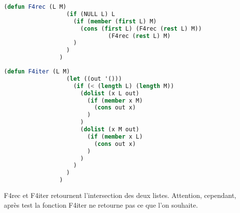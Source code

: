 \documentclass[a4paper, 12pt, leqno]{report}
\theoremstyle{plain}
\begin{document}
            
            \begin{lstlisting}[label=some-code,caption=F4 (L M) version recursive,language=lisp]
                (defun F4rec (L M)
	              (if (NULL L) L
		            (if (member (first L) M) 
		              (cons (first L) (F4rec (rest L) M)) 
                              (F4rec (rest L) M)
		            )	
	              )
                ) 
            \end{lstlisting}
          
            \begin{lstlisting}[label=some-code,caption=F4 (L M) version itérative,language=lisp]
                (defun F4iter (L M)
	              (let ((out '()))
		            (if (< (length L) (length M))
			          (dolist (x L out) 
				        (if (member x M)
					      (cons out x)
				        ) 
			          )
			          (dolist (x M out)
				        (if (member x L)
					      (cons out x)
				        )
			          )
		            )
	              )
                )
            \end{lstlisting}       
F4rec et F4iter retournent l'intersection des deux listes. Attention, cependant, après test la fonction F4iter ne retourne pas ce que l'on souhaite.
          
\end{document}

